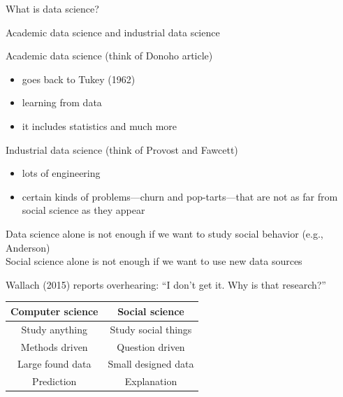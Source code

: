 \documentclass{beamer}
\def\vf{\vfill}
\begin{document}
\begin{frame}

\begin{center}
\LARGE{What is data science?}
\end{center}
Academic data science and industrial data science

\end{frame}
\begin{frame}

Academic data science (think of Donoho article)\\
\begin{itemize}
\item goes back to Tukey (1962)
\pause
\item learning from data
\pause
\item it includes statistics and much more
\end{itemize}

\end{frame}
\begin{frame}

Industrial data science (think of Provost and Fawcett)
\begin{itemize}
\item lots of engineering
\pause
\item certain kinds of problems---churn and pop-tarts---that are not as far from social science as they appear
\end{itemize}

\end{frame}
\begin{frame}

Data science alone is not enough if we want to study social behavior (e.g., Anderson)\\
\pause
Social science alone is not enough if we want to use new data sources

\end{frame}
\begin{frame}

Wallach (2015) reports overhearing: ``I don't get it.  Why is that research?''\\
\pause
\vf
\begin{center}
\begin{tabular}{cc}
Computer science & Social science\\
\midrule
Study anything & Study social things\\
Methods driven & Question driven\\
Large found data & Small designed data\\
Prediction & Explanation\\
\end{tabular}
\end{center}

\vf
{}

\end{frame}
\end{document}
